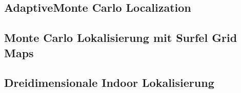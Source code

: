 \subsection{AdaptiveMonte Carlo Localization}\label{subsec:mcl_surfel}


\subsection{Monte Carlo Lokalisierung mit Surfel Grid Maps}\label{subsec:mcl_surfel}


\subsection{Dreidimensionale Indoor Lokalisierung}\label{subsec:}
